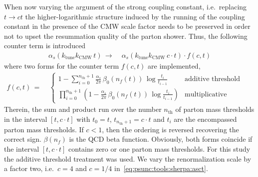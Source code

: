 When now varying the argument of the strong coupling constant, i.e.\ 
replacing $t\to ct$ the higher-logarithmic structure induced by the running 
of the coupling constant in the presence of the CMW scale factor needs to be 
preserved in order not to upset the resummation quality of the parton 
shower. Thus, the following counter term is introduced
\begin{equation}
  \begin{split}\label{eq:psunc:tools:sherpa:asct}
    \alpha_s(k_\text{tune}k_\text{CMW}\,t)
    \,\to\;& \alpha_s(k_\text{tune}k_\text{CMW}\, c\cdot t)\cdot f(c,t)
  \end{split}
\end{equation}
where two forms for the counter term $f(c,t)$ are implemented,
\begin{equation}
  \begin{split}\label{eq:psunc:tools:sherpa:asctfac}
    f(c,t)
    \,=\;&\left\{\begin{array}{ll}
                  1-\sum_{i=0}^{n_\text{th}+1}\frac{\alpha_s}{2\pi}\,\beta_0(n_f(t))\,\log\frac{t_i}{t_{i-1}} & \text{additive threshold treatment}\\
                  \prod_{i=0}^{n_\text{th}+1}\left(1-\frac{\alpha_s}{2\pi}\,\beta_0(n_f(t))\,\log\frac{t_i}{t_{i-1}}\right) & \text{multiplicative threshold treatment.}
                 \end{array}\right.
  \end{split}
\end{equation}
Therein, the sum and product run over the number $n_\text{th}$ of parton mass
thresholds in the interval $[t,c\cdot t]$ with $t_0=t$,
$t_{n_\text{th}+1}=c\cdot t$ and $t_i$ are the encompassed parton mass
thresholds. If $c<1$, then the ordering is reversed recovering the correct
sign. $\beta(n_f)$ is the QCD beta function. Obviously, both forms coincide if
the interval $[t,c\cdot t]$ contains zero or one parton mass thresholds. For
this study the additive threshold treatment was used. We vary the
renormalization scale by a factor two, i.e.\ $c=4$ and $c=1/4$
in~\ref{eq:psunc:tools:sherpa:asct}.

